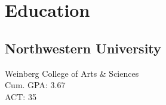 
\section{Education}

\subsection{Northwestern University}
Weinberg College of Arts \& Sciences
\\ Cum. GPA: 3.67
\\ ACT: 35
\sectionsep

